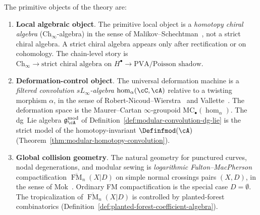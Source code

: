 \begin{remark}
\label{rem:three-pillars}
The primitive objects of the theory are:
\begin{enumerate}[label=\textup{(\Alph*)}]
\item \textbf{Local algebraic object}. The primitive local
 object is a \emph{homotopy chiral algebra}
 ($\mathrm{Ch}_\infty$-algebra) in the sense of
 Malikov--Schechtman~\cite{MS24}, not a strict chiral algebra. A strict
 chiral algebra appears only after rectification or on cohomology.
 The chain-level story is
 $\mathrm{Ch}_\infty \to \text{strict chiral algebra on } H^\bullet
 \to \text{PVA/Poisson shadow}$.

\item \textbf{Deformation-control object}. The universal
 deformation machine is a \emph{filtered convolution $sL_\infty$-algebra}
 $\operatorname{hom}_\alpha(\cC, \cA)$ relative to a twisting morphism
 $\alpha$, in the sense of Robert-Nicoud--Wierstra~\cite{RNW19} and
 Vallette~\cite{Val16}. The deformation space is the Maurer--Cartan
 $\infty$-groupoid $\mathrm{MC}_\bullet(\operatorname{hom}_\alpha)$.
 The dg~Lie algebra $\mathfrak{g}_\cA^{\mathrm{mod}}$ of
 Definition~\ref{def:modular-convolution-dg-lie} is the strict model of
 the homotopy-invariant $\Definfmod(\cA)$
 (Theorem~\ref{thm:modular-homotopy-convolution}).

\item \textbf{Global collision geometry}. The natural
 geometry for punctured curves, nodal degenerations, and modular sewing
 is \emph{logarithmic Fulton--MacPherson} compactification
 $\overline{\operatorname{FM}}_n(X|D)$ on simple normal crossings pairs
 $(X, D)$, in the sense of Mok~\cite{Mok25}. Ordinary FM
 compactification is the special case $D = \emptyset$. The
 tropicalization of $\overline{\operatorname{FM}}_n(X|D)$ is controlled
 by planted-forest combinatorics
 (Definition~\ref{def:planted-forest-coefficient-algebra}).
\end{enumerate}
\end{remark}

